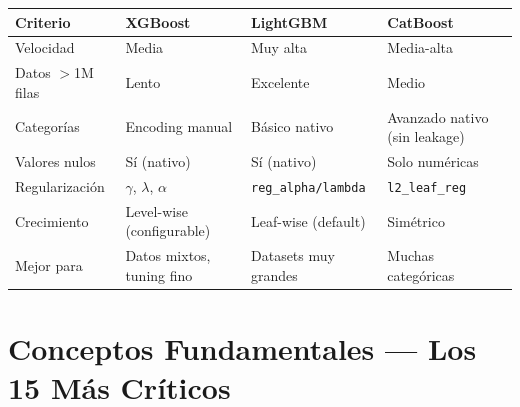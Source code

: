 \documentclass[11pt, a4paper]{book}
\begin{document}
\begin{center}
  \begin{tabular}{llll}
    \toprule
    \textbf{Criterio} & \textbf{XGBoost} & \textbf{LightGBM} & \textbf{CatBoost}\\
    \midrule
    Velocidad & Media & Muy alta & Media-alta\\
    Datos $>$1M filas & Lento & Excelente & Medio\\
    Categorías & Encoding manual & Básico nativo & Avanzado nativo (sin leakage)\\
    Valores nulos & Sí (nativo) & Sí (nativo) & Solo numéricas\\
    Regularización & $\gamma$, $\lambda$, $\alpha$ & \texttt{reg\_alpha/lambda} & \texttt{l2\_leaf\_reg}\\
    Crecimiento & Level-wise (configurable) & Leaf-wise (default) & Simétrico\\
    Mejor para & Datos mixtos, tuning fino & Datasets muy grandes & Muchas categóricas\\
    \bottomrule
  \end{tabular}
\end{center}

\chapter{Conceptos Fundamentales — Los 15 Más Críticos}
\end{document}
